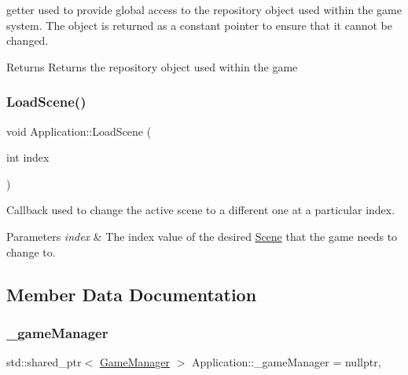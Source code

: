 getter used to provide global access to the repository object used within the game system. The object is returned as a constant pointer to ensure that it cannot be changed. 

\begin{DoxyReturn}{Returns}
Returns the repository object used within the game 
\end{DoxyReturn}
\mbox{\label{class_application_ac73bbfb4af8c54f6ae777863b7fa7099}} 
\subsubsection{\texorpdfstring{Load\+Scene()}{LoadScene()}}
{\footnotesize\ttfamily void Application\+::\+Load\+Scene (\begin{DoxyParamCaption}\item[{int}]{index }\end{DoxyParamCaption})\hspace{0.3cm}{\ttfamily [static]}}



Callback used to change the active scene to a different one at a particular index. 


\begin{DoxyParams}{Parameters}
{\em index} & The index value of the desired \hyperlink{class_scene}{Scene} that the game needs to change to. \\
\hline
\end{DoxyParams}


\subsection{Member Data Documentation}
\mbox{\label{class_application_a4e102be4f84b7a22a159f6030bc022bd}} 
\subsubsection{\texorpdfstring{\+\_\+game\+Manager}{\_gameManager}}
{\footnotesize\ttfamily std\+::shared\+\_\+ptr$<$ \hyperlink{class_game_manager}{Game\+Manager} $>$ Application\+::\+\_\+game\+Manager = nullptr\hspace{0.3cm}{\ttfamily [static]}, {\ttfamily [private]}}

